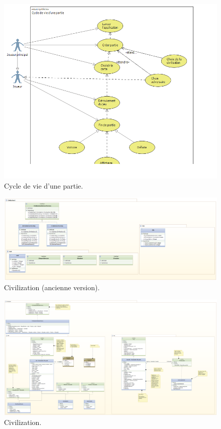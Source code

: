 \begin{figure}
    \begin{center}  
    \includegraphics[width=\textwidth]{cyclevie.png}
    \caption{Cycle de vie d'une partie.}
    \label{cyclevie}
\end{center}
\end{figure}


\begin{figure}
    \begin{center}  
    \includegraphics[width=\textwidth]{oldciv.png}
    \caption{Civilization (ancienne version).}
    \label{oldciv}
\end{center}
\end{figure}

\begin{figure}
    \begin{center}  
    \includegraphics[width=\textwidth]{civ.png}
    \caption{Civilization.}
    \label{civ}
\end{center}
\end{figure}

